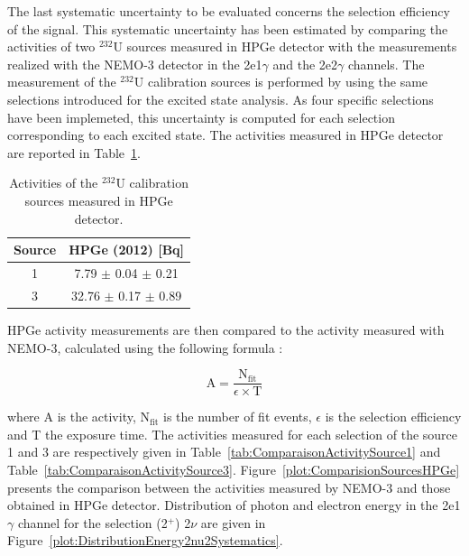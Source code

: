 \documentclass[main.tex]{subfiles}
\begin{document}
\NI The last systematic uncertainty to be evaluated concerns the selection efficiency of the signal. This systematic uncertainty has been estimated by comparing the activities of two $^{\text{232}}$U sources measured in HPGe detector with the measurements realized with the NEMO-3 detector in the 2e1$\gamma$ and the 2e2$\gamma$ channels. The measurement of the $^{\text{232}}$U calibration sources is performed by using the same selections introduced for the excited state analysis. As four specific selections have been implemeted, this uncertainty is computed for each selection corresponding to each excited state. The activities measured in HPGe detector are reported in Table~\ref{tab:HPGeMeasurementU232}.


\begin{table}[h!]
\centering
\begin{tabular}{c|c}
Source & HPGe (2012) [Bq]   \\[0.1cm]
\hline
1         & 7.79  $\pm$ 0.04 $\pm$ 0.21 \\ [0.1cm]
3        & 32.76 $\pm$ 0.17 $\pm$ 0.89 \\ [0.1cm]
\hline
\end{tabular}
\caption{Activities of the $^{\text{232}}$U calibration sources measured in HPGe detector.}
\label{tab:HPGeMeasurementU232}
\end{table}  


\bigskip


\NI HPGe activity measurements are then compared to the activity measured with NEMO-3, calculated using the following formula :


\begin{equation}
\text{A} = \frac{\text{N}_{\text{fit}}}{\epsilon \times \text{T}}
\end{equation}


\NI where A is the activity, N$_{\text{fit}}$ is the number of fit events, $\epsilon$ is the selection efficiency and T the exposure time. The activities measured for each selection of the source 1 and 3 are respectively given in Table~\ref{tab:ComparaisonActivitySource1} and Table~\ref{tab:ComparaisonActivitySource3}. Figure~\ref{plot:ComparisionSourcesHPGe} presents the comparison between the activities measured by NEMO-3 and those obtained in HPGe detector. Distribution of photon and electron energy in the 2e1$\gamma$ channel for the selection (2$^+$) 2$\nu$ are given in Figure~\ref{plot:DistributionEnergy2nu2Systematics}.
\end{document}
